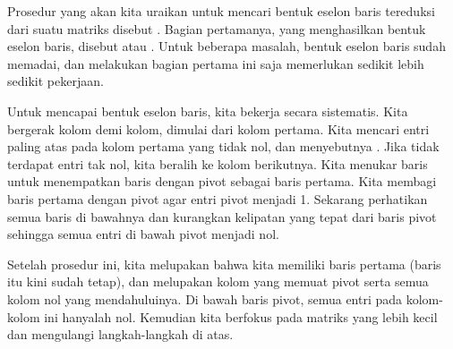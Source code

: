 Prosedur yang akan kita uraikan untuk mencari bentuk eselon baris tereduksi
dari suatu matriks
disebut \emph{}.
Bagian pertamanya, yang menghasilkan bentuk eselon baris, disebut
\emph{} atau
\emph{}. Untuk beberapa masalah, bentuk eselon
baris sudah memadai, dan melakukan bagian pertama ini saja memerlukan sedikit lebih sedikit pekerjaan.

Untuk mencapai bentuk eselon baris, kita bekerja secara sistematis.
Kita bergerak kolom demi kolom, dimulai dari kolom pertama. Kita mencari
entri paling atas pada kolom pertama yang tidak nol, dan menyebutnya
\emph{}. Jika tidak terdapat entri tak nol,
kita beralih ke kolom berikutnya. Kita menukar baris untuk menempatkan baris dengan
pivot sebagai baris pertama. Kita membagi baris pertama
dengan pivot agar entri pivot menjadi 1. Sekarang perhatikan semua baris di bawahnya
dan kurangkan kelipatan yang tepat dari baris pivot sehingga semua entri
di bawah pivot menjadi nol.

Setelah prosedur ini, kita melupakan bahwa kita memiliki baris pertama (baris itu kini sudah tetap),
dan melupakan kolom yang memuat pivot serta semua kolom nol yang mendahuluinya.
Di bawah baris pivot, semua entri pada kolom-kolom ini hanyalah
nol. Kemudian kita berfokus pada matriks yang lebih kecil dan mengulangi langkah-langkah
di atas.

